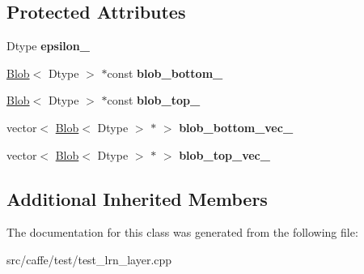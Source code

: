 \subsection*{Protected Attributes}
\begin{DoxyCompactItemize}
\item 
\mbox{\label{classcaffe_1_1_l_r_n_layer_test_a9f8fa20c8daa609698a4622fddef04ae}} 
Dtype {\bfseries epsilon\+\_\+}
\item 
\mbox{\label{classcaffe_1_1_l_r_n_layer_test_a106cf6604bfbf4f1d02eabcb0e813a7b}} 
\mbox{\hyperlink{classcaffe_1_1_blob}{Blob}}$<$ Dtype $>$ $\ast$const {\bfseries blob\+\_\+bottom\+\_\+}
\item 
\mbox{\label{classcaffe_1_1_l_r_n_layer_test_a28e97666c0492aef3dd9ce142e97dc80}} 
\mbox{\hyperlink{classcaffe_1_1_blob}{Blob}}$<$ Dtype $>$ $\ast$const {\bfseries blob\+\_\+top\+\_\+}
\item 
\mbox{\label{classcaffe_1_1_l_r_n_layer_test_abe7b6c0ee4c184f1b2841384aebb4170}} 
vector$<$ \mbox{\hyperlink{classcaffe_1_1_blob}{Blob}}$<$ Dtype $>$ $\ast$ $>$ {\bfseries blob\+\_\+bottom\+\_\+vec\+\_\+}
\item 
\mbox{\label{classcaffe_1_1_l_r_n_layer_test_ad149626bb3a254991caf6897c7fece9f}} 
vector$<$ \mbox{\hyperlink{classcaffe_1_1_blob}{Blob}}$<$ Dtype $>$ $\ast$ $>$ {\bfseries blob\+\_\+top\+\_\+vec\+\_\+}
\end{DoxyCompactItemize}
\subsection*{Additional Inherited Members}


The documentation for this class was generated from the following file\+:\begin{DoxyCompactItemize}
\item 
src/caffe/test/test\+\_\+lrn\+\_\+layer.\+cpp\end{DoxyCompactItemize}
